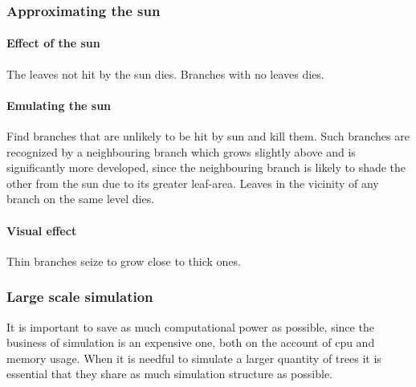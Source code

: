 \subsubsection{Approximating the sun}
\paragraph{Effect of the sun}
The leaves not hit by the sun dies. Branches with no leaves dies. 
\paragraph{Emulating the sun}
Find branches that are unlikely to be hit by sun and kill them. Such branches
are recognized by a neighbouring branch which grows slightly above and is 
significantly more developed, since the neighbouring branch is likely 
to shade the other
from the sun due to its greater leaf-area. Leaves in the vicinity of any
branch on the same level dies.
\paragraph{Visual effect}
Thin branches seize to grow close to thick ones.
\subsubsection{Large scale simulation}
It is important to save as much computational power as possible, since the
business of simulation is an expensive one, both on the account of cpu and
memory usage. When it is needful to simulate a larger quantity of trees it is
essential that they share as much simulation structure as possible.
